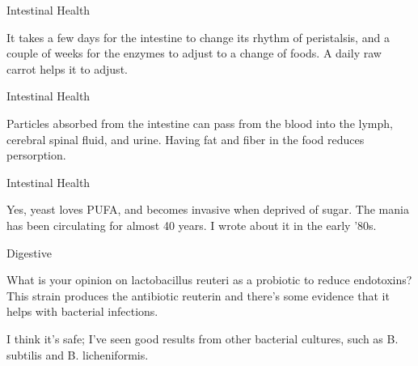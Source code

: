 \documentclass[11pt,oneside,openany,extrafontsizes]{memoir}
\begin{document}
\begin{standalonequote}{Intestinal Health}

    \begin{answer}
        It takes a few days for the intestine to change its rhythm of peristalsis, and a couple of weeks for the enzymes to adjust to a change of foods. A daily raw carrot helps it to adjust.
    \end{answer}
\end{standalonequote}

\begin{standalonequote}{Intestinal Health}

    \begin{answer}
        Particles absorbed from the intestine can pass from the blood into the lymph, cerebral spinal fluid, and urine. Having fat and fiber in the food reduces persorption.
    \end{answer}
\end{standalonequote}

\begin{standalonequote}{Intestinal Health}

    \begin{answer}
        Yes, yeast loves PUFA, and becomes invasive when deprived of sugar. The mania has been circulating for almost 40 years. I wrote about it in the early '80s.
    \end{answer}
\end{standalonequote}

\begin{qaexchange}{Digestive}

    \begin{question}
        What is your opinion on lactobacillus reuteri as a probiotic to reduce endotoxins? This strain produces the antibiotic reuterin and there's some evidence that it helps with bacterial infections.
    \end{question}

    \begin{answer}
        I think it's safe; I've seen good results from other bacterial cultures, such as B. subtilis and B. licheniformis.
    \end{answer}
\end{qaexchange}
\end{document}
